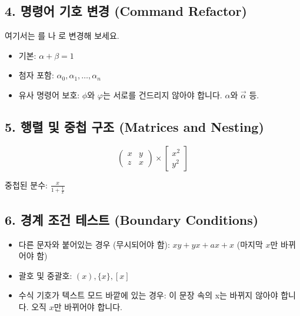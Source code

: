 \documentclass{article}
\begin{document}
\subsection{4. 명령어 기호 변경 (Command Refactor)}
여기서는 \textbf{\alpha}를 \textbf{\beta}나 \textbf{\gamma}로 변경해 보세요.
\begin{itemize}
    \item 기본: $\alpha + \beta = 1$
    \item 첨자 포함: $\alpha_0, \alpha_1, \dots, \alpha_n$
    \item 유사 명령어 보호: $\phi$와 $\varphi$는 서로를 건드리지 않아야 합니다. $\alpha$와 $\vec{\alpha}$ 등.
\end{itemize}

\subsection{5. 행렬 및 중첩 구조 (Matrices and Nesting)}
\[
\begin{pmatrix}
x & y \\
z & x
\end{pmatrix}
\times
\begin{bmatrix}
x^2 \\
y^2
\end{bmatrix}
\]

중첩된 분수:
$ \frac{x}{1 + \frac{1}{x}} $

\subsection{6. 경계 조건 테스트 (Boundary Conditions)}
\begin{itemize}
    \item 다른 문자와 붙어있는 경우 (무시되어야 함): $xy + yx + ax + x$ (마지막 $x$만 바뀌어야 함)
    \item 괄호 및 중괄호: $(x), \{x\}, [x]$
    \item 수식 기호가 텍스트 모드 바깥에 있는 경우:
    이 문장 속의 x는 바뀌지 않아야 합니다. 오직 $x$만 바뀌어야 합니다.
\end{itemize}
\end{document}
